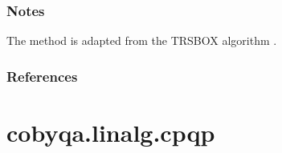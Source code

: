 \documentclass[letterpaper,10pt,english]{sphinxmanual}
\begin{document}
\begin{fulllineitems}
\begin{quote}
\begin{description}
\end{description}\end{quote}
\subsubsection*{Notes}

\sphinxAtStartPar
The method is adapted from the TRSBOX algorithm .
\subsubsection*{References}

\sphinxAtStartPar
{}

\end{fulllineitems}



\section{cobyqa.linalg.cpqp}
\label{\detokenize{refs/generated/cobyqa.linalg.cpqp:cobyqa-linalg-cpqp}}\label{\detokenize{refs/generated/cobyqa.linalg.cpqp::doc}}
\end{document}
